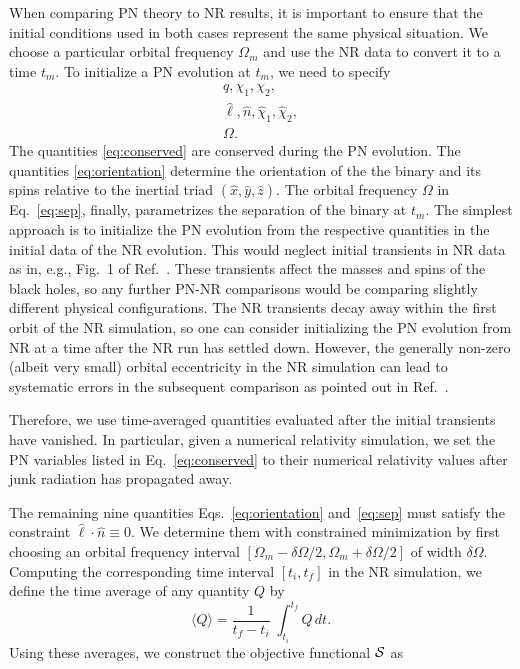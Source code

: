 \documentclass[aps,prd,amsmath,floatfix,twocolumn,superscriptaddress,nofootinbib,showpacs]{revtex4-1}
\newcommand{\ellHat}{\ensuremath{\hat{\ell}}}
\newcommand{\nHat}{\ensuremath{\hat{n}}}
\begin{document}
When comparing PN theory to NR results, it is important to ensure that
the initial conditions used in both cases represent the same physical
situation. We choose a particular orbital frequency $\Omega_{m}$ and
use the NR data to convert it to a time $t_{m}$.  To initialize a PN
evolution at $t_{m}$, we need to specify
\begin{gather}
q,\chi_{1},\chi_{2}, \label{eq:conserved}\\
\ellHat,\nHat,\hat{\chi}_{1},\hat{\chi}_{2}, \label{eq:orientation} \\
\Omega. \label{eq:sep}
\end{gather}
The quantities \eqref{eq:conserved} are conserved during the PN
evolution. The quantities \eqref{eq:orientation} determine the
orientation of the the binary and its spins relative to the inertial
triad $(\hat{x},\hat{y},\hat{z})$. The orbital frequency $\Omega$ in
Eq.~\eqref{eq:sep}, finally, parametrizes the separation of the binary
at $t_{m}$. The simplest approach is to initialize the PN evolution
from the respective quantities in the initial data of the NR
evolution. This would neglect initial transients in NR data as in,
e.g., Fig.~1 of Ref.~\cite{Chu2009}. These transients affect the
masses and spins of the black holes, so any further PN-NR comparisons
would be comparing slightly different physical configurations. The NR
transients decay away within the first orbit of the NR simulation, so
one can consider initializing the PN evolution from NR at a time after
the NR run has settled down. However, the generally non-zero (albeit
very small) orbital eccentricity in the NR simulation can lead to
systematic errors in the subsequent comparison as pointed out in
Ref.~\cite{Boyle2007}.

Therefore, we use time-averaged quantities evaluated after the initial
transients have vanished. In particular, given a numerical relativity
simulation, we set the PN variables listed in Eq.~\eqref{eq:conserved}
to their numerical relativity values after junk radiation has
propagated away.

The remaining nine quantities Eqs.~\eqref{eq:orientation}
and~\eqref{eq:sep} must satisfy the constraint $\ellHat \cdot
\nHat\equiv 0$.  We determine them with constrained minimization by
first choosing an orbital frequency interval $[\Omega_m
-\delta\Omega/2, \Omega_m+\delta\Omega/2]$ of width $\delta\Omega$.
Computing the corresponding time interval $[t_{i},t_{f}]$ in the NR
simulation, we define the time average of any quantity $Q$ by
\begin{equation}
\langle Q\rangle=\frac{1}{t_f-t_i}\;\int_{t_i}^{t_f} Q\, dt.
\end{equation}
Using these averages, we construct the objective functional $\cal S$
as
\end{document}
